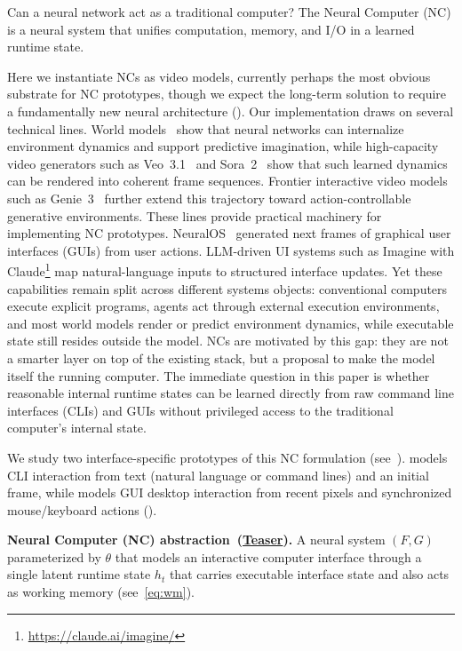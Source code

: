 Can a neural network act as a traditional computer?  
The Neural Computer (NC) is a neural system that unifies computation, memory, and I/O in a learned runtime state.

Here we instantiate NCs as video models, currently perhaps
the most obvious substrate for NC prototypes, though we expect the long-term solution to require a fundamentally new neural architecture ().
Our implementation draws on several technical lines. World models~\citep{ha2018world} show that neural networks can internalize environment dynamics and support predictive imagination, while high-capacity video generators such as Veo~3.1~\citep{google_veo3_1_2025} and Sora~2~\citep{openai_sora2_2025} show that such learned dynamics can be rendered into coherent frame sequences.
Frontier interactive video models such as Genie~3~\citep{bruce2024genie} further extend this trajectory toward action-controllable generative environments. These lines provide practical machinery for implementing NC prototypes. 
NeuralOS~\citep{rivard2025neuralos}  generated next frames of graphical user interfaces (GUIs) from user actions.  
LLM-driven UI systems such as Imagine with Claude\footnote{\url{https://claude.ai/imagine/}} map natural-language inputs to structured interface updates. 
Yet these capabilities remain split across different systems objects: conventional computers execute explicit programs, agents act through external execution environments, and most world models render or predict environment dynamics, while executable state still resides outside the model. 
NCs are motivated by this gap: they are not a smarter layer on top of the existing stack, but a proposal to make the model itself the running computer.
The immediate question in this paper is whether reasonable internal runtime states can be learned directly from raw command line interfaces (CLIs) and GUIs without privileged access to the traditional computer's internal state. 

We study two interface-specific prototypes of this NC formulation (see~).
\nccligen{} models CLI interaction from text (natural language or command lines) and an initial frame, while \ncguiworld{} models GUI desktop interaction from recent pixels and synchronized mouse/keyboard actions ().


\begin{tcolorbox}[
  colback=apricotglaze!40!white,
  colframe=metablue!40,
  interior style={shade,shading angle=315,left color=white,right color=apricotglaze!55!white},
  boxrule=0pt,
  borderline west={1pt}{0pt}{gray!60},
  left=6pt,right=4pt,top=3pt,bottom=3pt]
\small
\textbf{Neural Computer (NC) abstraction~(\hyperlink{teaser}{Teaser}).}
A neural system $(F, G)$ parameterized by $\theta$ that models an interactive computer interface through a single latent runtime state $h_t$ that carries executable interface state and also acts as working memory (see~\cref{eq:wm}).
\end{tcolorbox}

